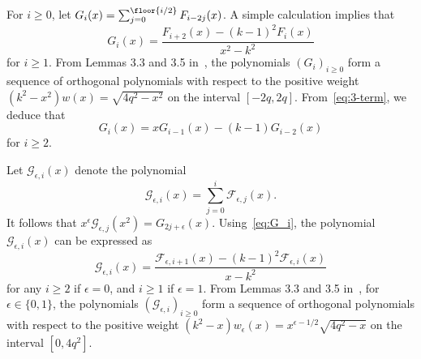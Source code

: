 For $i\geq 0$, let $G_i(x)=\sum_{j=0}^{\floor{i/2}}F_{i-2j}(x)$. A simple calculation implies that
\begin{equation} \label{eq:G_i}
{G}_{i}(x)=
\frac{{F}_{i+2}(x)-(k-1)^2 {F}_{i}(x) }{x^2-k^2}
\end{equation}
for $i\geq 1$.
From Lemmas 3.3 and 3.5 in~\cite{CK07}, the polynomials $(G_i)_{i\geq 0}$ form a sequence of 
orthogonal polynomials with respect to 
the positive weight $(k^2-x^2)w(x)=\sqrt{4q^2-x^2}$ on the interval $[-2q,2q]$. From~\eqref{eq:3-term}, we deduce that
\[
G_i(x)=xG_{i-1}(x)-(k-1)G_{i-2}(x)
\]
for $i\geq 2$. 

Let $\mathscr{G}_{\epsilon, i}(x)$ denote the 
polynomial 
\begin{equation} \label{eq:def_scrG}
\mathscr{G}_{\epsilon, i}(x)=\sum_{j=0}^i
\mathscr{F}_{\epsilon, j}(x). 
\end{equation} 
It follows that 
$x^{\epsilon} \mathscr{G}_{\epsilon, j}(x^2)=G_{2j+\epsilon}(x)$. Using~\eqref{eq:G_i}, the polynomial $\mathscr{G}_{\epsilon, i}(x)$ can be expressed as
\begin{equation} \label{eq:pro_scrG}
\mathscr{G}_{\epsilon, i}(x)=
\frac{\mathscr{F}_{\epsilon, i+1}(x)-(k-1)^2\mathscr{F}_{\epsilon, i}(x) }{x-k^2}
\end{equation}
for any $i\geq 2$ if $\epsilon=0$, and
$i\geq 1$ if $\epsilon=1$. 
From Lemmas 3.3 and 3.5 in~\cite{CK07}, 
for $\epsilon\in \{0,1\}$, the polynomials $(\mathscr{G}_{\epsilon,i})_{i\geq 0}$ form a sequence of orthogonal polynomials with respect to 
the positive weight $(k^2-x)w_{\epsilon}(x)=x^{\epsilon-1/2}\sqrt{4q^2-x}$ on the interval $[0,4q^2]$. 

